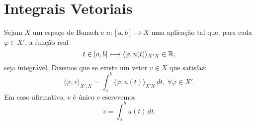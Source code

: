 


\section{Integrais Vetoriais}

\begin{definition}
Sejam $X$ um espaço de Banach e $u:[a,b]\longrightarrow X$ uma aplicação tal que, para cada $\varphi\in X'$,  a função real
\[t\in [a,b] \longmapsto \langle\varphi, u(t) \rangle_{X'X}\in \mathbb{R},\]
seja integrável. Dizemos que  se existe um vetor $v\in X$ que satisfaz:
\[\langle \varphi, v\rangle_{X',X}=\int_a^b \langle\varphi, u(t) \rangle_{X'X}\,dt,\ \forall \varphi\in X'.\]
Em caso afirmativo, $v$ é único e escrevemos
\[v=\int_a^b u(t)\,dt.\]
\end{definition}

